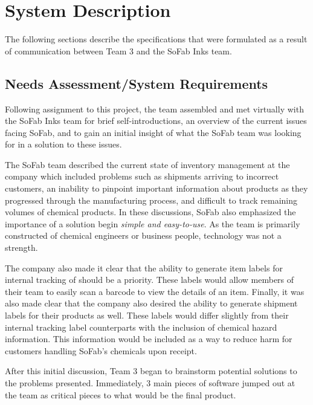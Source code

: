 \documentclass{article}
\begin{document}
\section{System Description}
The following sections describe the specifications that were formulated as a result of communication between Team 3 and the SoFab Inks
team. 
\subsection{Needs Assessment\slash System Requirements}
Following assignment to this project, the team assembled and met virtually with the SoFab Inks team for brief self-introductions, 
an overview of the current issues facing SoFab, and to gain an initial insight of what the SoFab team was looking for in a
solution to these issues. 

The SoFab team described the current state of inventory management at the company which included problems such as shipments arriving 
to incorrect customers, an inability to pinpoint important information about products as they progressed through the manufacturing 
process, and difficult to track remaining volumes of chemical products. In these discussions, SoFab also emphasized the importance 
of a solution begin \textit{simple and easy-to-use}. As the team is primarily constructed of chemical engineers or business people, 
technology was not a strength. 

The company also made it clear that the ability to generate item labels for internal tracking of 
should be a priority. These labels would allow members of their team to easily scan a barcode to view the details of an item. Finally, 
it was also made clear that the company also desired the ability to generate shipment labels for their products as well. These labels 
would differ slightly from their internal tracking label counterparts with the inclusion of chemical hazard information. This information
would be included as a way to reduce harm for customers handling SoFab's chemicals upon receipt.

After this initial discussion, Team 3 began to brainstorm potential solutions to the problems presented. Immediately, 3 main 
pieces of software jumped out at the team as critical pieces to what would be the final product.
\end{document}
